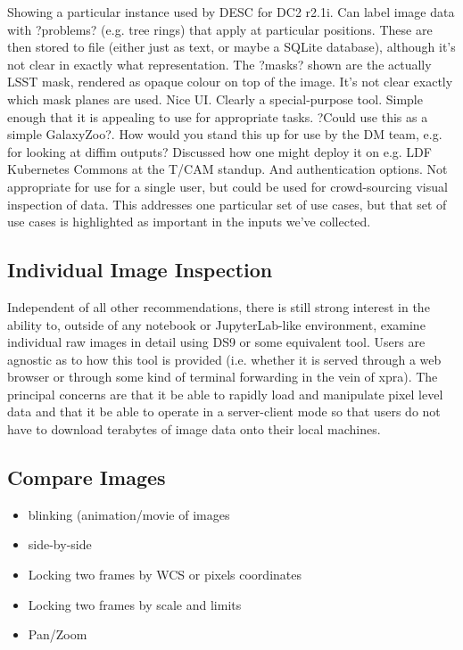 Showing a particular instance used by DESC for DC2 r2.1i.
Can label image data with ?problems? (e.g. tree rings) that apply at particular positions.
These are then stored to file (either just as text, or maybe a SQLite database), although it's not clear in exactly what representation.
The ?masks? shown are the actually LSST mask, rendered as opaque colour on top of the image.
It's not clear exactly which mask planes are used.
Nice UI.
Clearly a special-purpose tool.
Simple enough that it is appealing to use for appropriate tasks.
?Could use this as a simple GalaxyZoo?.
How would you stand this up for use by the DM team, e.g. for looking at diffim outputs?
Discussed how one might deploy it on e.g. LDF Kubernetes Commons at the T/CAM standup.
And authentication options.
Not appropriate for use for a single user, but could be used for crowd-sourcing visual inspection of data.
This addresses one particular set of use cases, but that set of use cases is highlighted as important in the inputs we've collected.

\subsection{Individual Image Inspection}
\label{sec:ds9}
Independent of all other recommendations, there is still strong interest in the
ability to, outside of any notebook or JupyterLab-like environment, examine
individual raw images in detail using DS9 or some equivalent tool.  Users are
agnostic as to how this tool is provided (i.e. whether it is served through a
web browser or through some kind of terminal forwarding in the vein of xpra).
The principal concerns are that it be able to rapidly load and manipulate pixel
level data and that it be able to operate in a server-client mode so that users
do not have to download terabytes of image data onto their local machines.


\subsection{Compare Images}
\begin{itemize}
\item{blinking (animation/movie of images}
\item{side-by-side}
\item{Locking two frames by WCS or pixels coordinates}
\item{Locking two frames by scale and limits}
\item{Pan/Zoom}
\end{itemize}

